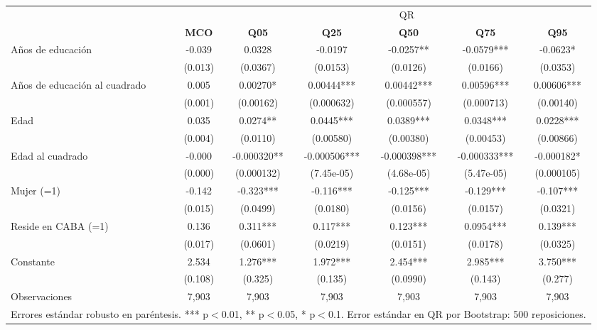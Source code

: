 {\begin{tabular}{lcccccc} 
		\hline \hline
		& & \multicolumn{5}{c}{QR} \\  \cmidrule(lr){3-7}
		& \textbf{MCO} & \textbf{Q05} & \textbf{Q25} & \textbf{Q50} & \textbf{Q75} & \textbf{Q95} \\  \hline
		Años de educación & -0.039\sym{***} & 0.0328 & -0.0197 & -0.0257** & -0.0579*** & -0.0623* \\
		 & (0.013) & (0.0367) & (0.0153) & (0.0126) & (0.0166) & (0.0353) \\
		 Años de educación al cuadrado & 0.005\sym{***} &  0.00270* & 0.00444*** & 0.00442*** & 0.00596*** & 0.00606*** \\
		&(0.001)& (0.00162) & (0.000632) & (0.000557) & (0.000713) & (0.00140) \\
		Edad & 0.035\sym{***}& 0.0274** & 0.0445*** & 0.0389*** & 0.0348*** & 0.0228*** \\
		&(0.004)  & (0.0110) & (0.00580) & (0.00380) & (0.00453) & (0.00866) \\
		Edad al cuadrado & -0.000\sym{***} & -0.000320** & -0.000506*** & -0.000398*** & -0.000333*** & -0.000182* \\
		& (0.000) & (0.000132) & (7.45e-05) & (4.68e-05) & (5.47e-05) & (0.000105) \\
		Mujer (=1) & -0.142\sym{***} & -0.323*** & -0.116*** & -0.125*** & -0.129*** & -0.107*** \\
		& (0.015) & (0.0499) & (0.0180) & (0.0156) & (0.0157) & (0.0321) \\
		Reside en CABA (=1) & 0.136\sym{***} & 0.311*** & 0.117*** & 0.123*** & 0.0954*** & 0.139*** \\
		&(0.017) & (0.0601) & (0.0219) & (0.0151) & (0.0178) & (0.0325) \\
		Constante & 2.534\sym{***} & 1.276*** & 1.972*** & 2.454*** & 2.985*** & 3.750*** \\
		& (0.108)  & (0.325) & (0.135) & (0.0990) & (0.143) & (0.277) \\
		Observaciones & 7,903 & 7,903 & 7,903 & 7,903 & 7,903 & 7,903 \\ \hline
		\multicolumn{7}{c}{\small{Errores estándar robusto en paréntesis. *** p$<$0.01, ** p$<$0.05, * p$<$0.1. Error estándar en QR por Bootstrap: 500 reposiciones.}} \\
	\end{tabular}
}
